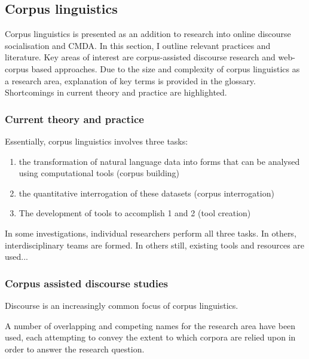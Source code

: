 
	\subsection{Corpus linguistics}

		Corpus linguistics is presented as an addition to research into online discourse socialisation and CMDA. In this section, I outline relevant practices and literature. Key areas of interest are corpus-assisted discourse research and web-corpus based approaches. Due to the size and complexity of corpus linguistics as a research area, explanation of key terms is provided in the glossary. Shortcomings in current theory and practice are highlighted.

		\subsubsection{Current theory and practice}

			Essentially, corpus linguistics involves three tasks:

			\begin{enumerate}
				\item the transformation of natural language data into forms that can be analysed using computational tools (corpus building)
				\item the quantitative interrogation of these datasets (corpus interrogation)
				\item The development of tools to accomplish 1 and 2 (tool creation)
			\end{enumerate}

			In some investigations, individual researchers perform all three tasks. In others, interdisciplinary teams are formed. In others still, existing tools and resources are used...

		\subsubsection{Corpus assisted discourse studies}

			Discourse is an increasingly common focus of corpus linguistics.

			A number of overlapping and competing names for the research area have been used, each attempting to convey the extent to which corpora are relied upon in order to answer the research question.

